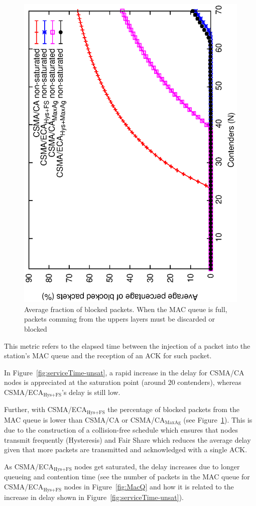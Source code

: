 	\begin{figure}[tb]
		\centering
		\includegraphics[width=0.7\linewidth,angle=-90]{figures/unsaturated/blockingProb-unsat/blocking-unsaturated.eps}
		\caption{Average fraction of blocked packets. When the MAC queue is full, packets comming from the uppers layers must be discarded or blocked}
		\label{fig:blocked-packets}
	\end{figure}	
	
	This metric refers to the elapsed time between the injection of a packet into the station's MAC queue and the reception of an ACK for such packet. 
	
	In Figure~\ref{fig:serviceTime-unsat}, a rapid increase in the delay for CSMA/CA nodes is appreciated at the saturation point (around 20 contenders), whereas CSMA/ECA$_{\text{Hys+FS}}$'s delay is still low. 
	
	Further, with CSMA/ECA$_{\text{Hys+FS}}$ the percentage of blocked packets from the MAC queue is lower than CSMA/CA or CSMA/CA$_{\text{MaxAg}}$ (see Figure~\ref{fig:blocked-packets}). This is due to the construction of a collision-free schedule which ensures that nodes transmit frequently (Hysteresis) and Fair Share which reduces the average delay given that more packets are transmitted and acknowledged with a single ACK.
	
	As CSMA/ECA$_{\text{Hys+FS}}$ nodes get saturated, the delay increases due to longer queueing and contention time (see the number of packets in the MAC queue for CSMA/ECA$_{\text{Hys+FS}}$ nodes in Figure~\ref{fig:MacQ} and how it is related to the increase in delay shown in Figure~\ref{fig:serviceTime-unsat}).
	
